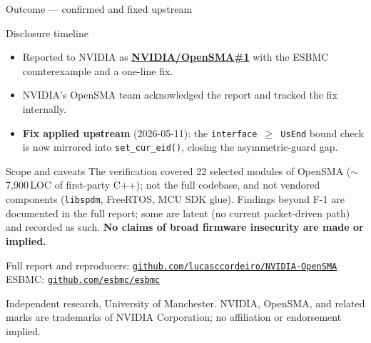 \documentclass[aspectratio=169,11pt]{beamer}
\newcommand{\hil}[1]{\textbf{\textcolor{nvgreendark}{#1}}}
\begin{document}
\begin{frame}{Outcome --- confirmed and fixed upstream}
  \begin{block}{Disclosure timeline}
    \footnotesize
    \begin{itemize}\setlength\itemsep{0.15em}
      \item Reported to NVIDIA as
            \href{https://github.com/NVIDIA/OpenSMA/issues/1}{\hil{NVIDIA/OpenSMA\#1}}
            with the ESBMC counterexample and a one-line fix.
      \item NVIDIA's OpenSMA team acknowledged the report and tracked the
            fix internally.
      \item \hil{Fix applied upstream} (2026-05-11): the
            \texttt{interface\,$\geq$\,UsEnd} bound check is now mirrored
            into \texttt{set\_cur\_eid()}, closing the asymmetric-guard gap.
    \end{itemize}
  \end{block}

  \vspace{0.3em}
  \begin{block}{Scope and caveats}
    \scriptsize
    The verification covered 22 selected modules of OpenSMA
    ($\sim$7{,}900\,LOC of first-party C++); not the full codebase, and
    not vendored components (\texttt{libspdm}, FreeRTOS, MCU SDK glue).
    Findings beyond F-1 are documented in the full report; some are
    latent (no current packet-driven path) and recorded as such.
    \hil{No claims of broad firmware insecurity are made or implied.}
  \end{block}

  \vspace{0.3em}
  \centering
  \footnotesize
  Full report and reproducers:
  \href{https://github.com/lucasccordeiro/NVIDIA-OpenSMA}{\texttt{github.com/lucasccordeiro/NVIDIA-OpenSMA}}
  \\[0.2em]
  ESBMC: \href{https://github.com/esbmc/esbmc}{\texttt{github.com/esbmc/esbmc}}

  \vspace{0.5em}
  {\tiny\textcolor{nvgray}{Independent research, University of Manchester.
  NVIDIA, OpenSMA, and related marks are trademarks of NVIDIA Corporation;
  no affiliation or endorsement implied.}}
\end{frame}
\end{document}

